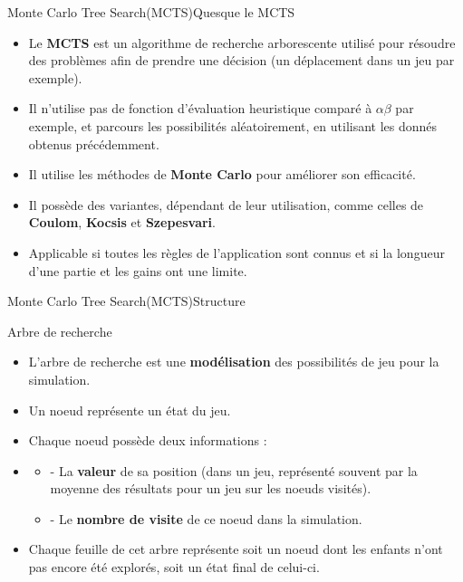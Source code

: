 \begin{frame}{Monte Carlo Tree Search(MCTS)}{Quesque le MCTS}
	\begin{block}{}
		\begin{itemize}
			\item Le \textbf{MCTS} est un algorithme de recherche arborescente utilisé pour résoudre des problèmes afin de prendre une décision (un déplacement dans un jeu par exemple).
			\item Il n'utilise pas de fonction d'évaluation heuristique comparé à \textbf{$\alpha$$\beta$} par exemple, et parcours les possibilités aléatoirement, en utilisant les donnés obtenus précédemment.
			\item Il utilise les méthodes de \textbf{Monte Carlo} pour améliorer son efficacité.
			\item Il possède des variantes, dépendant de leur utilisation, comme celles de \textbf{Coulom}, \textbf{Kocsis} et \textbf{Szepesvari}.
			\item Applicable si toutes les règles de l'application sont connus et si la longueur d'une partie et les gains ont une limite.	
		\end{itemize}
	\end{block}
\end{frame}

\begin{frame}{Monte Carlo Tree Search(MCTS)}{Structure}
	\begin{block}{Arbre de recherche}
		\begin{itemize}
			\item L'arbre de recherche est une \textbf{modélisation} des possibilités de jeu pour la simulation.
			\item Un noeud représente un état du jeu.
			\item Chaque noeud possède deux informations :
			\item\begin{itemize}
				\item - La \textbf{valeur} de sa position (dans un jeu, représenté souvent par la moyenne des résultats pour un jeu sur les noeuds visités).
				\item - Le \textbf{nombre de visite} de ce noeud dans la simulation.
			\end{itemize}
			\item Chaque feuille de cet arbre représente soit un noeud dont les enfants n'ont pas encore été explorés, soit un état final de celui-ci.		
		\end{itemize}
	\end{block}
\end{frame}

